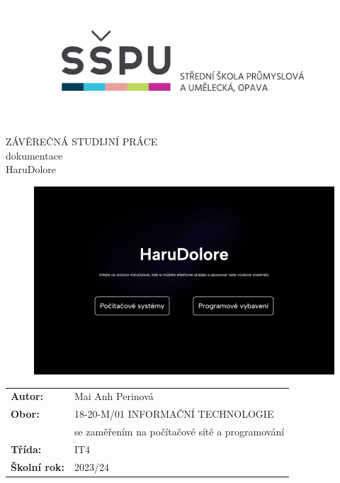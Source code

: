 \documentclass[12pt, a4paper,
oneside,      %
openright
]{report}
\title{\nazevPrace} %
\author{\jmenoAutora} %
\date{\datumOdevzdani} %
\newcommand\obor{INFORMAČNÍ TECHNOLOGIE} %
\newcommand\kodOboru{18-20-M/01} %
\newcommand\zamereni{se zaměřením na počítačové sítě a programování} %
\newcommand\trida{IT4} %
\newcommand\jmenoAutora{Mai Anh Perinová}  %
\newcommand\skolniRok{2023/24} %
\newcommand\nazevPrace{HaruDolore} %
\begin{document}
	
	\pagestyle{empty}
	
	\cleardoublepage

	
	{\selectfont
		\begin{figure}[h]
			\centering
			\includegraphics[width=0.6\linewidth]{image/logo-skoly.png} 
		\end{figure}
		
		
		{\bfseries %
			\begin{center}
				\vspace{0.025 \textheight}
				\LARGE{ZÁVĚREČNÁ STUDIJNÍ PRÁCE}\\
				\large{dokumentace}\\
				\vspace{0.075 \textheight}
				\LARGE {\nazevPrace}\\
			\end{center}  
		}%
		
		\begin{figure}[h]
			\centering
			\includegraphics[width=0.9\linewidth]{image/homepage.png} 
		\end{figure}
		
		\vspace{0.02 \textheight}
		\begin{table}[h!]
			\begin{tabular}{ll}
				\textbf{Autor:} & \jmenoAutora\\ 
				\textbf{Obor:} & \kodOboru { } \obor\\
				\textbf{} & \zamereni\\
				\textbf{Třída:} & \trida\\
				\textbf{Školní rok:} & \skolniRok\\
			\end{tabular}
			
		\end{table}		
	}
	
\end{document}
